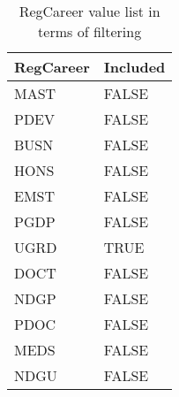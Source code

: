 \begin{table}[H]
    \centering
    \label{RegCareerFilter}
    \begin{tabular}{|l|l|}
        \hline
        \multicolumn{1}{|c|}{\textbf{RegCareer}} & \multicolumn{1}{c|}{\textbf{Included}} \\
        \hline
        MAST                                     & FALSE                                  \\
        PDEV                                     & FALSE                                  \\
        BUSN                                     & FALSE                                  \\
        HONS                                     & FALSE                                  \\
        EMST                                     & FALSE                                  \\
        PGDP                                     & FALSE                                  \\
        UGRD                                     & TRUE                                   \\
        DOCT                                     & FALSE                                  \\
        NDGP                                     & FALSE                                  \\
        PDOC                                     & FALSE                                  \\
        MEDS                                     & FALSE                                  \\
        NDGU                                     & FALSE                                  \\
        \hline
    \end{tabular}
    \caption{RegCareer value list in terms of filtering}
\end{table}


